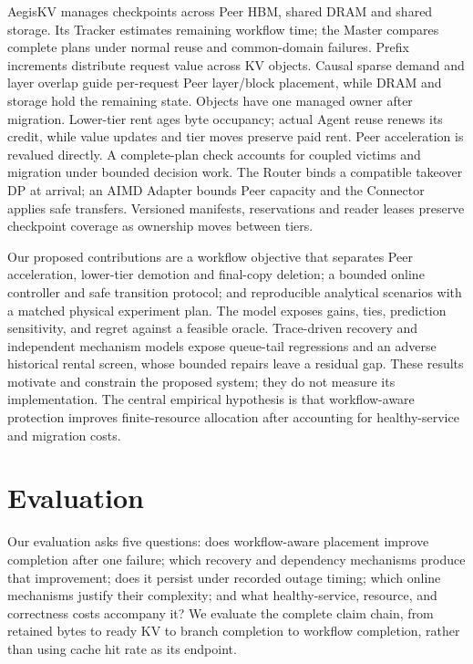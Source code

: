\documentclass[sigplan,10pt,anonymous,nonacm]{acmart}
\begin{document}
AegisKV manages checkpoints across Peer HBM, shared DRAM and shared storage.
Its Tracker estimates remaining workflow time; the Master compares
complete plans under normal reuse and common-domain failures. Prefix
increments distribute request value across KV objects. Causal sparse
demand and layer overlap guide per-request Peer layer/block placement,
while DRAM and storage hold the remaining state. Objects have one managed
owner after migration. Lower-tier rent ages byte occupancy; actual Agent
reuse renews its credit, while value updates and tier moves preserve paid
rent. Peer acceleration is revalued directly. A complete-plan check
accounts for coupled victims and migration under bounded decision work.
The Router binds a compatible takeover DP at arrival; an AIMD Adapter
bounds Peer capacity and the Connector applies safe transfers.
Versioned manifests, reservations and reader leases preserve checkpoint
coverage as ownership moves between tiers.

Our proposed contributions are a workflow objective that separates Peer
acceleration, lower-tier demotion and final-copy deletion; a bounded online controller and safe transition
protocol; and reproducible analytical scenarios with a matched physical
experiment plan. The model exposes gains, ties, prediction sensitivity,
and regret against a feasible oracle. Trace-driven recovery and independent
mechanism models expose queue-tail regressions and an adverse historical
rental screen, whose bounded repairs leave a residual gap. These results
motivate and constrain the proposed
system; they do not measure its implementation. The central empirical
hypothesis is that workflow-aware protection improves finite-resource
allocation after accounting for healthy-service and migration costs.




\section{Evaluation}
\label{sec:evaluation}

Our evaluation asks five questions: does workflow-aware placement improve
completion after one failure; which recovery and dependency mechanisms
produce that improvement; does it persist under recorded outage timing;
which online mechanisms justify their complexity; and what healthy-service,
resource, and correctness costs accompany it? We evaluate the complete
claim chain, from retained bytes to ready KV to branch completion to
workflow completion, rather than using cache hit rate as its endpoint.
\end{document}
